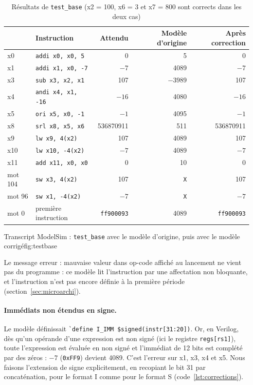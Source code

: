\begin{table}[H]
\centering
\begin{tabular}{llrrr}
\toprule
 & Instruction & Attendu & Modèle d'origine & Après correction \\
\midrule
x0  & \texttt{addi x0, x0, 5}   & 0         & 5         & 0 \\
x1  & \texttt{addi x1, x0, -7}  & $-7$      & 4089      & $-7$ \\
x3  & \texttt{sub x3, x2, x1}   & 107       & $-3989$   & 107 \\
x4  & \texttt{andi x4, x1, -16} & $-16$     & 4080      & $-16$ \\
x5  & \texttt{ori x5, x0, -1}   & $-1$      & 4095      & $-1$ \\
x8  & \texttt{srl x8, x5, x6}   & 536870911 & 511       & 536870911 \\
x9  & \texttt{lw x9, 4(x2)}     & 107       & 4089      & 107 \\
x10 & \texttt{lw x10, -4(x2)}   & $-7$      & 4089      & $-7$ \\
x11 & \texttt{add x11, x0, x0}  & 0         & 10        & 0 \\
\midrule
mot 104 & \texttt{sw x3, 4(x2)}  & 107  & \texttt{X} & 107 \\
mot 96  & \texttt{sw x1, -4(x2)} & $-7$ & \texttt{X} & $-7$ \\
mot 0   & première instruction & \texttt{ff900093} & 4089 & \texttt{ff900093} \\
\bottomrule
\end{tabular}
\caption{Résultats de \texttt{test\_base} (x2 = 100, x6 = 3 et x7 = 800 sont corrects dans les deux cas)}
\label{tab:testbase}
\end{table}

{Transcript ModelSim : \texttt{test\_base} avec le modèle d'origine, puis avec le modèle
corrigé}{fig:testbase}

Le message \og erreur : mauvaise valeur dans op-code\fg{} affiché au lancement ne vient pas du
programme : ce modèle lit l'instruction par une affectation non bloquante, et l'instruction n'est
pas encore définie à la première période (section~\ref{sec:microarchi}).

\paragraph{Immédiats non étendus en signe.}
Le modèle définissait \lstinline[style=vlinline]|`define I_IMM $signed(instr[31:20])|. Or, en
Verilog, dès qu'un opérande d'une expression est non signé (ici le registre
\texttt{regs[rs1]}), toute l'expression est évaluée en non signé et l'immédiat de 12 bits est
complété par des zéros : $-7$ (\texttt{0xFF9}) devient 4089. C'est l'erreur sur x1, x3, x4 et x5.
Nous faisons l'extension de signe explicitement, en recopiant le bit 31 par concaténation, pour
le format I comme pour le format S (code~\ref{lst:corrections}).

